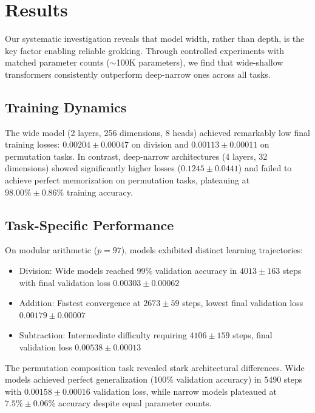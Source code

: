 \documentclass{article} %
\begin{document}
\section{Results}
\label{sec:results}

Our systematic investigation reveals that model width, rather than depth, is the key factor enabling reliable grokking. Through controlled experiments with matched parameter counts ($\sim$100K parameters), we find that wide-shallow transformers consistently outperform deep-narrow ones across all tasks.

\subsection{Training Dynamics}
The wide model (2 layers, 256 dimensions, 8 heads) achieved remarkably low final training losses: $0.00204 \pm 0.00047$ on division and $0.00113 \pm 0.00011$ on permutation tasks. In contrast, deep-narrow architectures (4 layers, 32 dimensions) showed significantly higher losses ($0.1245 \pm 0.0441$) and failed to achieve perfect memorization on permutation tasks, plateauing at $98.00\% \pm 0.86\%$ training accuracy.

\subsection{Task-Specific Performance}
On modular arithmetic ($p=97$), models exhibited distinct learning trajectories:
\begin{itemize}
    \item Division: Wide models reached 99\% validation accuracy in $4013 \pm 163$ steps with final validation loss $0.00303 \pm 0.00062$
    \item Addition: Fastest convergence at $2673 \pm 59$ steps, lowest final validation loss $0.00179 \pm 0.00007$
    \item Subtraction: Intermediate difficulty requiring $4106 \pm 159$ steps, final validation loss $0.00538 \pm 0.00013$
\end{itemize}

The permutation composition task revealed stark architectural differences. Wide models achieved perfect generalization (100\% validation accuracy) in $5490$ steps with $0.00158 \pm 0.00016$ validation loss, while narrow models plateaued at $7.5\% \pm 0.06\%$ accuracy despite equal parameter counts.
\end{document}
